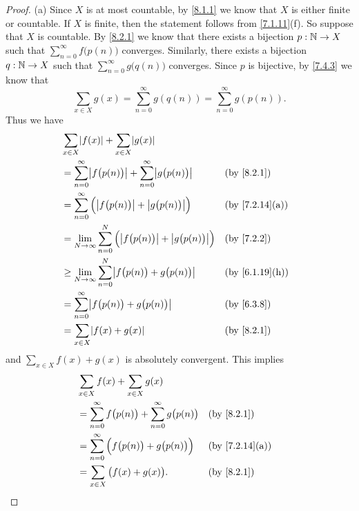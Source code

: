 \begin{proof}{(a)}
	Since \(X\) is at most countable, by \cref{8.1.1} we know that \(X\) is either finite or countable.
	If \(X\) is finite, then the statement follows from \cref{7.1.11}(f).
	So suppose that \(X\) is countable.
	By \cref{8.2.1} we know that there exists a bijection \(p : \mathbb{N} \to X\) such that \(\sum_{n = 0}^\infty f\big(p(n)\big)\) converges.
	Similarly, there exists a bijection \(q : \mathbb{N} \to X\) such that \(\sum_{n = 0}^\infty g\big(q(n)\big)\) converges.
	Since \(p\) is bijective, by \cref{7.4.3} we know that
	\[
		\sum_{x \in X} g(x) = \sum_{n = 0}^\infty g(q(n)) = \sum_{n = 0}^\infty g(p(n)).
	\]
	Thus we have
	\begin{align*}
		 & \sum_{x \in X} \abs{f(x)} + \sum_{x \in X} \abs{g(x)}                                                                          \\
		 & = \sum_{n = 0}^\infty \abs{f\big(p(n)\big)} + \sum_{n = 0}^\infty \abs{g\big(p(n)\big)}      &  & \by{8.2.1}                   \\
		 & = \sum_{n = 0}^\infty \Big(\abs{f\big(p(n)\big)} + \abs{g\big(p(n)\big)}\Big)                &  & \text{(by \cref{7.2.14}(a))} \\
		 & = \lim_{N \to \infty} \sum_{n = 0}^N \Big(\abs{f\big(p(n)\big)} + \abs{g\big(p(n)\big)}\Big) &  & \by{7.2.2}                   \\
		 & \geq \lim_{N \to \infty} \sum_{n = 0}^N \abs{f\big(p(n)\big) + g\big(p(n)\big)}              &  & \text{(by \cref{6.1.19}(h))} \\
		 & = \sum_{n = 0}^\infty \abs{f\big(p(n)\big) + g\big(p(n)\big)}                                &  & \by{6.3.8}                   \\
		 & = \sum_{x \in X} \abs{f(x) + g(x)}                                                           &  & \by{8.2.1}
	\end{align*}
	and \(\sum_{x \in X} f(x) + g(x)\) is absolutely convergent.
	This implies
	\begin{align*}
		 & \sum_{x \in X} f(x) + \sum_{x \in X} g(x)                                                                     \\
		 & = \sum_{n = 0}^\infty f\big(p(n)\big) + \sum_{n = 0}^\infty g\big(p(n)\big) &  & \by{8.2.1}                   \\
		 & = \sum_{n = 0}^\infty \Big(f\big(p(n)\big) + g\big(p(n)\big)\Big)           &  & \text{(by \cref{7.2.14}(a))} \\
		 & = \sum_{x \in X} \big(f(x) + g(x)\big).                                     &  & \by{8.2.1}
	\end{align*}
\end{proof}

